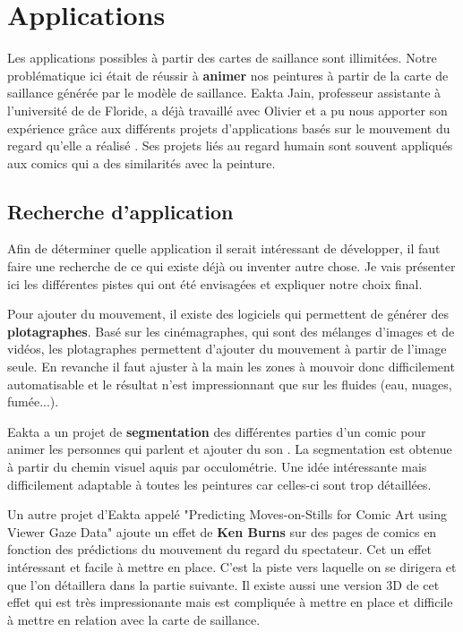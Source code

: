 \chapter{Applications}

\par
Les applications possibles à partir des cartes de saillance sont illimitées. Notre problématique ici était de réussir à \textbf{animer} nos peintures à partir de la carte de saillance générée par le modèle de saillance. Eakta Jain, professeur assistante à l'université de de Floride, a déjà travaillé avec Olivier et a pu nous apporter son expérience grâce aux différents projets d'applications basés sur le mouvement du regard qu'elle a réalisé \cite{eaktalab}. Ses projets liés au regard humain sont souvent appliqués aux comics qui a des similarités avec la peinture.

\section{Recherche d'application}

\par
Afin de déterminer quelle application il serait intéressant de développer, il faut faire une recherche de ce qui existe déjà ou inventer autre chose. Je vais présenter ici les différentes pistes qui ont été envisagées et expliquer notre choix final.

\par
Pour ajouter du mouvement, il existe des logiciels qui permettent de générer des \textbf{plotagraphes}. Basé sur les cinémagraphes, qui sont des mélanges d'images et de vidéos, les plotagraphes permettent d'ajouter du mouvement à partir de l'image seule. En revanche il faut ajuster à la main les zones à mouvoir donc difficilement automatisable et le résultat n'est impressionnant que sur les fluides (eau, nuages, fumée...).

\par
Eakta a un projet de \textbf{segmentation} des différentes parties d'un comic pour animer les personnes qui parlent et ajouter du son \cite{segmentationcomics}. La segmentation est obtenue à partir du chemin visuel aquis par occulométrie. Une idée intéressante mais difficilement adaptable à toutes les peintures car celles-ci sont trop détaillées.

\par
Un autre projet d'Eakta appelé "Predicting Moves-on-Stills for Comic Art using Viewer Gaze Data" \cite{kenburns} ajoute un effet de \textbf{Ken Burns} sur des pages de comics en fonction des prédictions du mouvement du regard du spectateur. Cet un effet intéressant et facile à mettre en place. C'est la piste vers laquelle on se dirigera et que l'on détaillera dans la partie suivante. Il existe aussi une version 3D de cet effet \cite{kenburns3D} qui est très impressionante mais est compliquée à mettre en place et difficile à mettre en relation avec la carte de saillance.

